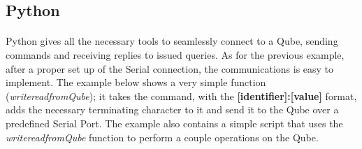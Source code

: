 
\subsection{Python}
\paragraph{} Python gives all the necessary tools to seamlessly connect to a Qube, sending commands and receiving replies to issued queries. As for the previous example, after a proper set up of the Serial connection, the communications is easy to implement.
\newline The example below shows a very simple function (\textit{write\textunderscore read\textunderscore from\textunderscore Qube}); it takes the command, with the \textbf{[identifier]:[value]} format, adds the necessary terminating character to it and send it to the Qube over a predefined Serial Port.
\newline The example also contains a simple script that uses the \textit{write\textunderscore read\textunderscore from\textunderscore Qube} function to perform a couple operations on the Qube.
\newline


